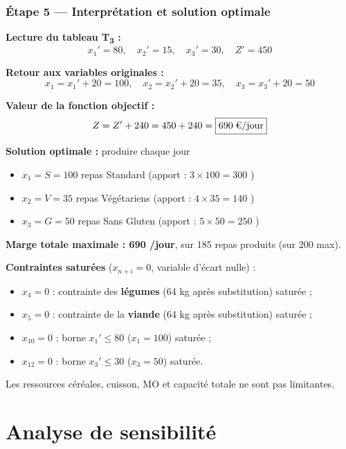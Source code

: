 \documentclass[12pt,a4paper]{article}
\begin{document}
\subsubsection{Étape 5 — Interprétation et solution optimale}

\noindent\textbf{Lecture du tableau T\textsubscript{3} :}
\[
x_1' = 80,\quad x_2' = 15,\quad x_3' = 30,\quad Z' = 450
\]

\noindent\textbf{Retour aux variables originales :}
\[
x_1 = x_1' + 20 = 100,\quad x_2 = x_2' + 20 = 35,\quad x_3 = x_3' + 20 = 50
\]

\noindent\textbf{Valeur de la fonction objectif :}
\[
Z = Z' + 240 = 450 + 240 = \boxed{690 \;\text{\texteuro}/\text{jour}}
\]

\begin{resultbox}
\textbf{Solution optimale :} produire chaque jour
\begin{itemize}[noitemsep]
  \item $\boxed{x_1 = S = 100}$ repas Standard \quad (apport : $3 \times 100 = 300$ \texteuro)
  \item $\boxed{x_2 = V = 35}$ repas Végétariens \quad (apport : $4 \times 35 = 140$ \texteuro)
  \item $\boxed{x_3 = G = 50}$ repas Sans Gluten \quad (apport : $5 \times 50 = 250$ \texteuro)
\end{itemize}
\textbf{Marge totale maximale : 690 \texteuro/jour}, sur 185 repas produits (sur 200 max).

\medskip
\noindent\textbf{Contraintes saturées} ($x_{n+i} = 0$, variable d'écart nulle) :
\begin{itemize}[noitemsep]
  \item $x_4 = 0$ : contrainte des \textbf{légumes} (64 kg après substitution) saturée ;
  \item $x_5 = 0$ : contrainte de la \textbf{viande} (64 kg après substitution) saturée ;
  \item $x_{10} = 0$ : borne $x_1' \leq 80$ ($x_1 = 100$) saturée ;
  \item $x_{12} = 0$ : borne $x_3' \leq 30$ ($x_3 = 50$) saturée.
\end{itemize}
Les ressources céréales, cuisson, MO et capacité totale ne sont pas limitantes.
\end{resultbox}

\newpage

\section{Analyse de sensibilité}
\end{document}
